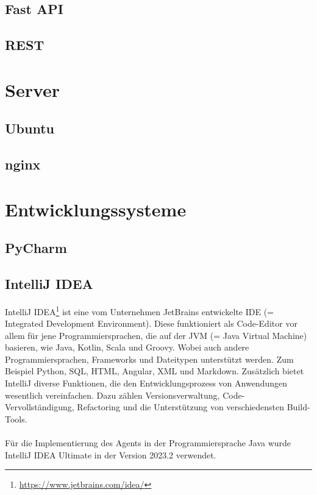 \documentclass{report}
\begin{document}
\subsection{Fast API}
\subsection{REST}

\section{Server}
\subsection{Ubuntu}
\subsection{nginx}

\section{Entwicklungssysteme}
\subsection{PyCharm}
\subsection{IntelliJ IDEA}
IntelliJ IDEA\footnote{\url{https://www.jetbrains.com/idea/}} ist eine vom Unternehmen JetBrains entwickelte IDE (= Integrated Development Environment). Diese funktioniert als Code-Editor vor allem für jene Programmiersprachen, die auf der JVM (= Java Virtual Machine) basieren, wie Java, Kotlin, Scala und Groovy. Wobei auch andere Programmiersprachen, Frameworks und Dateitypen unterstützt werden. Zum Beispiel Python, SQL, HTML, Angular, XML und Markdown. Zusätzlich bietet IntelliJ diverse Funktionen, die den Entwicklungsprozess von Anwendungen wesentlich vereinfachen. Dazu zählen Versionsverwaltung, Code-Vervollständigung, Refactoring und die Unterstützung von verschiedensten Build-Tools.\\\\
Für die Implementierung des Agents in der Programmiersprache Java wurde IntelliJ IDEA Ultimate in der Version 2023.2 verwendet.
\end{document}
